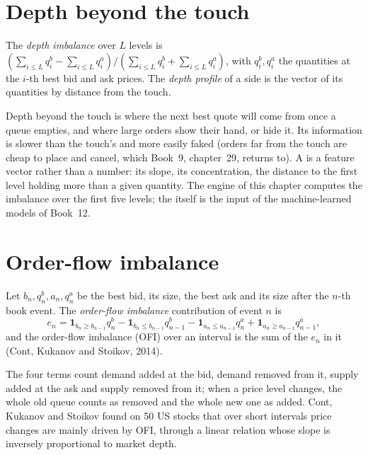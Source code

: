 \section{Depth beyond the touch}

\begin{definition}\label{def:rs:order-book-features:depth}
The \emph{depth imbalance} over $L$ levels is $(\sum_{i \le L}q^b_i - \sum_{i \le L}q^a_i)/(\sum_{i\le L}q^b_i
+ \sum_{i \le L}q^a_i)$, with $q^b_i, q^a_i$ the quantities at the $i$-th best bid and ask prices. The \emph{depth profile} of a side is the vector of its quantities by distance from the touch.
\end{definition}

Depth beyond the touch is where the next best quote will come from once a queue empties, and where large orders show their hand, or
hide it. Its information is slower than the touch's and more easily faked (orders far from the touch are cheap to place and cancel,
which Book~9, chapter~29, returns to). A  is a feature vector rather than a number: its slope, its concentration, the
distance to the first level holding more than a given quantity. The engine of this chapter computes the imbalance over the first five
levels; the  itself is the input of the machine-learned models of Book~12.

\section{Order-flow imbalance}

\begin{definition}\label{def:rs:order-book-features:ofi}
Let $b_n, q^b_n, a_n, q^a_n$ be the best bid, its size, the best ask and its size after the $n$-th book event. The \emph{order-flow
imbalance} contribution of event $n$ is
\[
e_n = \mathbf 1_{b_n \ge b_{n-1}}q^b_n - \mathbf 1_{b_n \le b_{n-1}}q^b_{n-1} - \mathbf 1_{a_n \le a_{n-1}}q^a_n + \mathbf 1_{a_n \ge
a_{n-1}}q^a_{n-1},
\]
and the order-flow imbalance (OFI) over an interval is the sum of the $e_n$ in it (Cont, Kukanov and Stoikov, 2014).
\end{definition}

The four terms count demand added at the bid, demand removed from it, supply added at the ask and supply removed from it; when a
price level changes, the whole old queue counts as removed and the whole new one as added. Cont, Kukanov and Stoikov found on 50 US
stocks that over short intervals price changes are mainly driven by OFI, through a linear relation whose slope is inversely proportional
to market depth.

